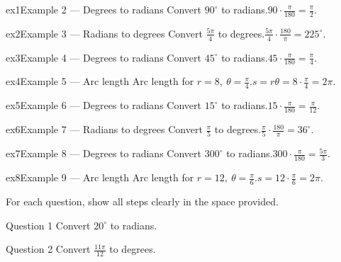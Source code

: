\documentclass[11pt]{article}
\begin{document}
\begin{example}{ex1}{Example 2 --- Degrees to radians}
Convert $90^\circ$ to radians.\soln $90\cdot\tfrac{\pi}{180}=\tfrac{\pi}{2}$.
\end{example}

\begin{example}{ex2}{Example 3 --- Radians to degrees}
Convert $\tfrac{5\pi}{4}$ to degrees.\soln $\tfrac{5\pi}{4}\cdot\tfrac{180}{\pi}=225^\circ$.
\end{example}

\begin{example}{ex3}{Example 4 --- Degrees to radians}
Convert $45^\circ$ to radians.\soln $45\cdot\tfrac{\pi}{180}=\tfrac{\pi}{4}$.
\end{example}

\begin{example}{ex4}{Example 5 --- Arc length}
Arc length for $r=8,\ \theta=\tfrac{\pi}{4}$.\soln $s=r\theta=8\cdot\tfrac{\pi}{4}=2\pi$.
\end{example}

\begin{example}{ex5}{Example 6 --- Degrees to radians}
Convert $15^\circ$ to radians.\soln $15\cdot\tfrac{\pi}{180}=\tfrac{\pi}{12}$.
\end{example}

\begin{example}{ex6}{Example 7 --- Radians to degrees}
Convert $\tfrac{\pi}{5}$ to degrees.\soln $\tfrac{\pi}{5}\cdot\tfrac{180}{\pi}=36^\circ$.
\end{example}

\begin{example}{ex7}{Example 8 --- Degrees to radians}
Convert $300^\circ$ to radians.\soln $300\cdot\tfrac{\pi}{180}=\tfrac{5\pi}{3}$.
\end{example}

\begin{example}{ex8}{Example 9 --- Arc length}
Arc length for $r=12,\ \theta=\tfrac{\pi}{6}$.\soln $s=12\cdot\tfrac{\pi}{6}=2\pi$.
\end{example}

\clearpage
{}
For each question, show all steps clearly in the space provided.

\begin{qbox}{Question 1}
Convert $20^\circ$ to radians.\workspace{2.4cm}
\end{qbox}

\begin{qbox}{Question 2}
Convert $\tfrac{11\pi}{12}$ to degrees.\workspace{2.4cm}
\end{qbox}
\end{document}
